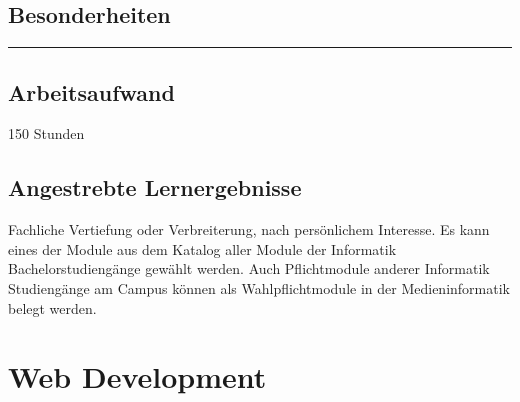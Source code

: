 \hypertarget{besonderheitenpathlabel....srcmodulbeschreibungen-bachelor-bpo5ba_wpf-2}{%
\section*{Besonderheiten\label{../../src/modulbeschreibungen-bachelor-bpo5/BA_WPF-2}}\label{besonderheitenpathlabel....srcmodulbeschreibungen-bachelor-bpo5ba_wpf-2}}

\begin{center}\rule{0.5\linewidth}{0.5pt}\end{center}

\hypertarget{arbeitsaufwandpathlabel....srcmodulbeschreibungen-bachelor-bpo5ba_wpf-2}{%
\section*{Arbeitsaufwand\label{../../src/modulbeschreibungen-bachelor-bpo5/BA_WPF-2}}\label{arbeitsaufwandpathlabel....srcmodulbeschreibungen-bachelor-bpo5ba_wpf-2}}

150 Stunden

\hypertarget{angestrebte-lernergebnissepathlabel....srcmodulbeschreibungen-bachelor-bpo5ba_wpf-2}{%
\section*{Angestrebte
Lernergebnisse\label{../../src/modulbeschreibungen-bachelor-bpo5/BA_WPF-2}}\label{angestrebte-lernergebnissepathlabel....srcmodulbeschreibungen-bachelor-bpo5ba_wpf-2}}

Fachliche Vertiefung oder Verbreiterung, nach persönlichem Interesse. Es
kann eines der Module aus dem Katalog aller Module der Informatik
Bachelorstudiengänge gewählt werden. Auch Pflichtmodule anderer
Informatik Studiengänge am Campus können als Wahlpflichtmodule in der
Medieninformatik belegt werden.

\hypertarget{web-developmentpathlabel....srcmodulbeschreibungen-bachelor-bpo5ba_web-development}{%
\chapter{Web
Development\label{../../src/modulbeschreibungen-bachelor-bpo5/BA_Web-Development}}\label{web-developmentpathlabel....srcmodulbeschreibungen-bachelor-bpo5ba_web-development}}

